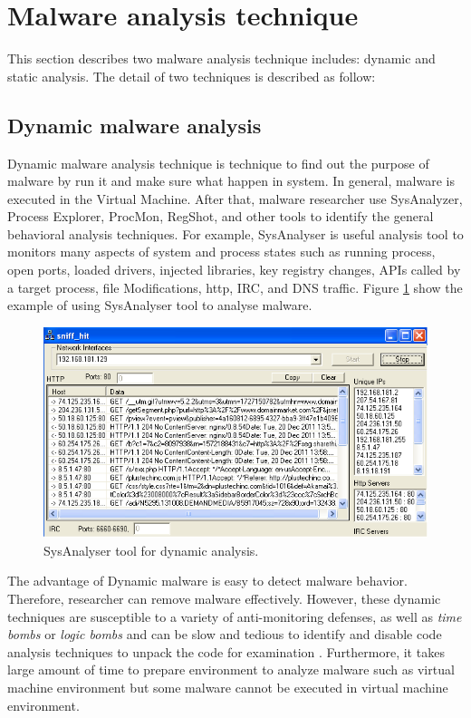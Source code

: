 \section{Malware analysis technique}
This section describes two malware analysis technique includes: dynamic and static analysis. The detail of two techniques is described as follow: 
\subsection{Dynamic malware analysis}
Dynamic malware analysis technique is technique to find out the purpose of malware by run it and make sure what happen in system. In general, malware is executed in the Virtual Machine. After that, malware researcher use SysAnalyzer, Process Explorer, ProcMon, RegShot, and other tools to identify the general behavioral analysis techniques. For example, SysAnalyser is useful analysis tool to monitors many aspects of system and process states such as running process, open ports, loaded drivers, injected libraries, key registry changes, APIs called by a target process, file Modifications, http, IRC, and DNS traffic. Figure \ref{fig:SysAnalyser} show the example of using SysAnalyser tool to analyse malware. 
\begin{figure}[h!]
\centering
\includegraphics[width=1\textwidth]{graph/SysAnalyser.png}
\caption{SysAnalyser tool for dynamic analysis.}
\label{fig:SysAnalyser}
\end{figure}
The advantage of Dynamic malware is easy to detect malware behavior. Therefore, researcher can remove malware effectively. However, these dynamic techniques are susceptible to a variety of anti-monitoring defenses, as well as \emph{time bombs} or \emph{logic bombs} and can be slow and tedious to identify and disable code analysis techniques to unpack the code for examination \cite{georg}. Furthermore, it takes large amount of time to prepare environment to analyze malware such as virtual machine environment but some malware cannot be executed in virtual machine environment. 
